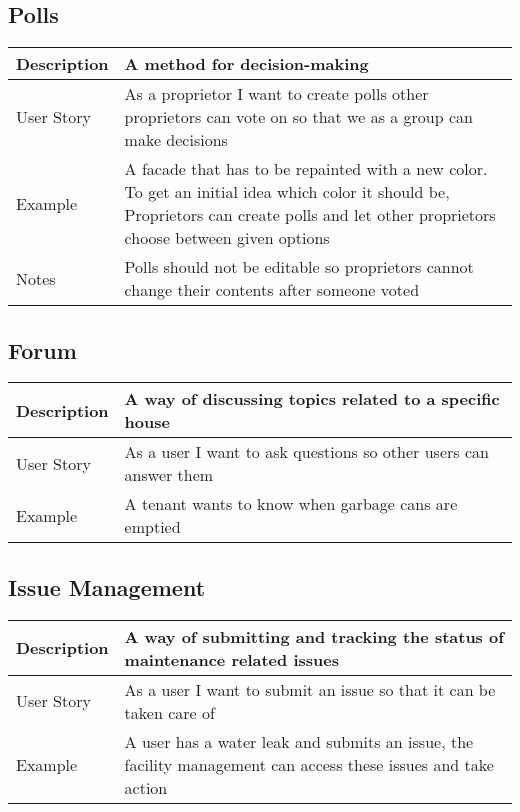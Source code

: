 \subsection{Polls}
\begin{table}[H]
  \begin{tabularx}{\linewidth}{l|X}
     Description & A method for decision-making \\
     \hline
     User Story & As a proprietor I want to create polls other proprietors can vote on so that we as a group can make decisions \\
     \hline
     Example & A facade that has to be repainted with a new color. To get an initial idea which color it should be, Proprietors can create polls and let other proprietors choose between given options \\
     \hline
     Notes & Polls should not be editable so proprietors cannot change their contents after someone voted
  \end{tabularx}
\end{table}

\subsection{Forum}
\begin{table}[H]
  \begin{tabularx}{\linewidth}{l|X}
     Description & A way of discussing topics related to a specific house \\
     \hline
     User Story & As a user I want to ask questions so other users can answer them \\
     \hline
     Example & A tenant wants to know when garbage cans are emptied
  \end{tabularx}
\end{table}

\subsection{Issue Management}
\begin{table}[H]
  \begin{tabularx}{\linewidth}{l|X}
     Description & A way of submitting and tracking the status of maintenance related issues \\
     \hline
     User Story & As a user I want to submit an issue so that it can be taken care of \\
     \hline
     Example & A user has a water leak and submits an issue, the facility management can access these issues and take action
  \end{tabularx}
\end{table}

